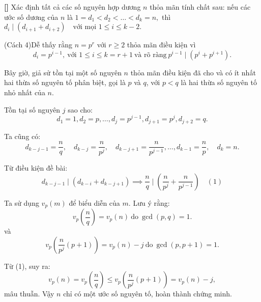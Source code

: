 \documentclass[../05-largest-exponent.tex]{subfiles}
\begin{document}
\begin{example*}\textbf{[]}
    Xác định tất cả các số nguyên hợp dương \( n \) thỏa mãn tính chất sau: nếu các ước số dương của \( n \) là $1 = d_1 < d_2 < \dots < d_k = n,$
    thì $d_i \mid (d_{i+1} + d_{i+2}) \quad \text{với mọi } 1 \leq i \leq k - 2.$
\end{example*}

\begin{soln}(Cách 4)\footnotemark[\value{footnote}]
    Dễ thấy rằng \( n = p^r \) với \( r \geq 2 \) thỏa mãn điều kiện vì 
    \[
        d_i = p^{i-1},\ \text{với } 1 \leq i \leq k = r+1\ \text{và rõ ràng}\ p^{i-1} \mid (p^i + p^{i+1}).
    \]
    
    Bây giờ, giả sử tồn tại một số nguyên \( n \) thỏa mãn điều kiện đã cho và có ít nhất hai thừa số nguyên tố phân biệt,
    gọi là \( p \) và \( q \), với \( p < q \) là hai thừa số nguyên tố nhỏ nhất của \( n \).
    
    Tồn tại số nguyên \( j \) sao cho:
    \[
        d_1 = 1, d_2 = p, \dots, d_j = p^{j-1}, d_{j+1} = p^j, d_{j+2} = q.
    \]
    
    Ta cũng có:
    \[
        d_{k-j-1} = \frac{n}{q}, \quad d_{k-j} = \frac{n}{p^j}, \quad d_{k-j+1} = \frac{n}{p^{j-1}}, \dots, d_{k-1} = \frac{n}{p}, \quad d_k = n.
    \]
    
    Từ điều kiện đề bài:
    \[
        d_{k-j-1} \mid (d_{k-i} + d_{k-j+1}) \implies \frac{n}{q} \mid \left( \frac{n}{p^j} + \frac{n}{p^{j-1}} \right)  \quad (1)
    \]
        
    Ta sử dụng \( v_p(m) \) để biểu diễn  của \( m \). Lưu ý rằng:
    \[
        v_p \left( \frac{n}{q} \right) = v_p(n)\ \text{do}\ \gcd(p,q) = 1.
    \]
    và
    \[
        v_p \left( \frac{n}{p^j} (p+1) \right) = v_p(n) - j \ \text{do}\ \gcd(p,p+1) = 1.
    \]

    Từ (1), suy ra:
    \[
        v_p(n) = v_p \left( \frac{n}{q} \right) \leq v_p \left( \frac{n}{p^j} (p+1) \right) = v_p(n) - j,
    \]
    mâu thuẫn. Vậy \( n \) chỉ có một ước số nguyên tố, hoàn thành chứng minh.
\end{soln}

\end{document}
